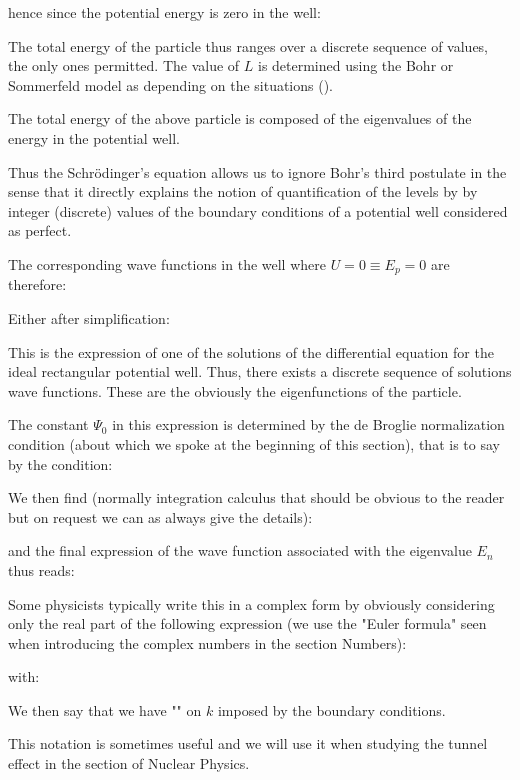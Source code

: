	hence since the potential energy is zero in the well:
	
	The total energy of the particle thus ranges over a discrete sequence of values, the only ones permitted. The value of $L$ is determined using the Bohr or Sommerfeld model as depending on the situations ().

	The total energy of the above particle is composed of the eigenvalues of the energy in the potential well.

	Thus the Schrödinger's equation allows us to ignore Bohr's third postulate in the sense that it directly explains the notion of quantification of the levels by by integer (discrete) values of the boundary conditions of a potential well considered as perfect.

	The corresponding wave functions in the well where $U=0 \equiv E_p=0$ are therefore:
	
	Either after simplification:
	
	This is the expression of one of the solutions of the differential equation for the ideal rectangular potential well. Thus, there exists a discrete sequence of solutions wave functions. These are the obviously the eigenfunctions of the particle.

	The constant $\Psi_0$ in this expression is determined by the de Broglie normalization  condition (about which we spoke at the beginning of this section), that is to say by the condition:
	
	We then find (normally integration calculus that should be obvious to the reader but on request we can as always give the details):
	
	and the final expression of the wave function associated with the eigenvalue $E_n$ thus reads:
	
	Some physicists typically write this in a complex form by obviously considering only the real part of the following expression (we use the "Euler formula" seen when introducing the complex numbers in the section Numbers):
	
	with:
	
	We then say that we have "" on $k$ imposed by the boundary conditions.

	This notation is sometimes useful and we will use it when studying the tunnel effect in the section of Nuclear Physics.

